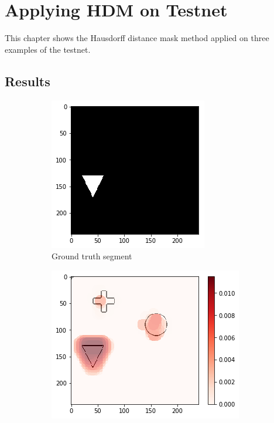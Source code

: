 \section{Applying HDM on Testnet}

This chapter shows the Hausdorff distance mask method applied on three examples of the testnet.

\subsection{Results}
\begin{figure}[H]
    \centering
    \begin{subfigure}[t]{.28\textwidth}
        \centering
        \includegraphics[width=\linewidth]{chapters/06_hdm/testnet/0.png}
        \caption{Ground truth segment}
    \end{subfigure}\hfill%
    \begin{subfigure}[t]{.34\textwidth}
        \centering
        \includegraphics[width=\linewidth]{chapters/06_hdm/testnet/2.png}

\end{subfigure}
\end{figure}
